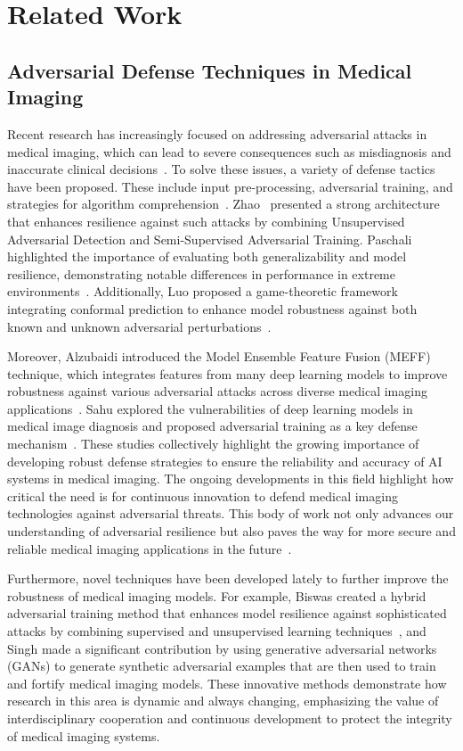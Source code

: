 \documentclass[preprint,12pt]{elsarticle}
\begin{document}
\section{Related Work}
\label{sec:related_work}

\subsection{Adversarial Defense Techniques in Medical Imaging}
Recent research has increasingly focused on addressing adversarial attacks in medical imaging, which can lead to severe consequences such as misdiagnosis and inaccurate clinical decisions~\cite{Dhamija24}. To solve these issues, a variety of defense tactics have been proposed. These include input pre-processing, adversarial training, and strategies for algorithm comprehension~\cite{Pal24}. Zhao~\cite{Zhao22} presented a strong architecture that enhances resilience against such attacks by combining Unsupervised Adversarial Detection and Semi-Supervised Adversarial Training. Paschali highlighted the importance of evaluating both generalizability and model resilience, demonstrating notable differences in performance in extreme environments~\cite{Priya23}. Additionally, Luo proposed a game-theoretic framework integrating conformal prediction to enhance model robustness against both known and unknown adversarial perturbations~\cite{Luo24}.

Moreover, Alzubaidi introduced the Model Ensemble Feature Fusion (MEFF) technique, which integrates features from many deep learning models to improve robustness against various adversarial attacks across diverse medical imaging applications~\cite{Alzubaidi24}. Sahu explored the vulnerabilities of deep learning models in medical image diagnosis and proposed adversarial training as a key defense mechanism~\cite{Sahu24}. These studies collectively highlight the growing importance of developing robust defense strategies to ensure the reliability and accuracy of AI systems in medical imaging. The ongoing developments in this field highlight how critical the need is for continuous innovation to defend medical imaging technologies against adversarial threats. This body of work not only advances our understanding of adversarial resilience but also paves the way for more secure and reliable medical imaging applications in the future~\cite{Ou24}.

Furthermore, novel techniques have been developed lately to further improve the robustness of medical imaging models. For example, Biswas created a hybrid adversarial training method that enhances model resilience against sophisticated attacks by combining supervised and unsupervised learning techniques~\cite{Biswas24}, and Singh made a significant contribution by using generative adversarial networks (GANs) to generate synthetic adversarial examples that are then used to train and fortify medical imaging models. These innovative methods demonstrate how research in this area is dynamic and always changing, emphasizing the value of interdisciplinary cooperation and continuous development to protect the integrity of medical imaging systems.
\end{document}
